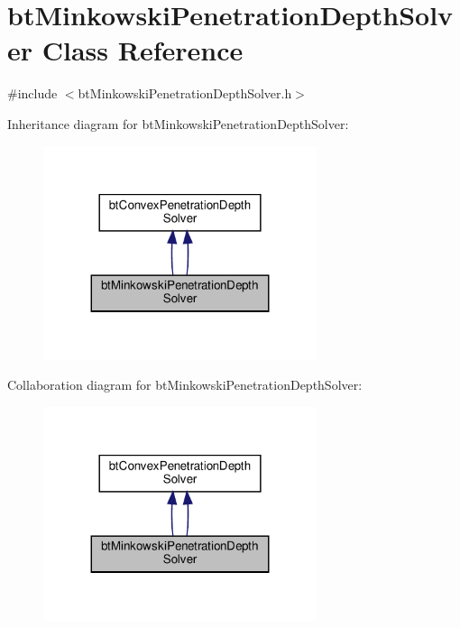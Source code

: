 \hypertarget{classbtMinkowskiPenetrationDepthSolver}{}\section{bt\+Minkowski\+Penetration\+Depth\+Solver Class Reference}
\label{classbtMinkowskiPenetrationDepthSolver}


{\ttfamily \#include $<$bt\+Minkowski\+Penetration\+Depth\+Solver.\+h$>$}



Inheritance diagram for bt\+Minkowski\+Penetration\+Depth\+Solver\+:
\nopagebreak
\begin{figure}[H]
\begin{center}
\leavevmode
\includegraphics[width=227pt]{classbtMinkowskiPenetrationDepthSolver__inherit__graph}
\end{center}
\end{figure}


Collaboration diagram for bt\+Minkowski\+Penetration\+Depth\+Solver\+:
\nopagebreak
\begin{figure}[H]
\begin{center}
\leavevmode
\includegraphics[width=227pt]{classbtMinkowskiPenetrationDepthSolver__coll__graph}
\end{center}
\end{figure}
